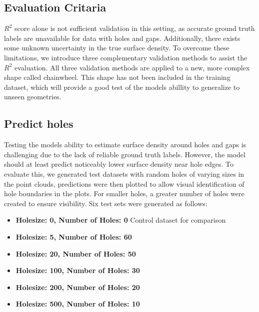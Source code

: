 \subsection{Evaluation Critaria}
$R^2$ score alone is not sufficient validation in this setting, as accurate ground truth labels are unavailable for data with holes and gaps. Additionally, there exists some unknown uncertainty in the true surface density. To overcome these limitations, we introduce three complementary validation methods to assist the $R^2$ evaluation. All three validation methods are applied to a new, more complex shape called chainwheel. This shape has not been included in the training dataset, which will provide a good test of the models abillity to generalize to unseen geometries.

\subsection*{Predict holes}
Testing the models ability to estimate surface density around holes and gaps is challenging due to the lack of reliable ground truth labels. However, the model should at least predict noticeably lower surface density near hole edges. To evaluate this, we generated test datasets with random holes of varying sizes in the point clouds, predictions were then plotted to allow visual identification of hole boundaries in the plots. For smaller holes, a greater number of holes were created to ensure visibility. Six test sets were generated as follows:
\begin{itemize}
    \item \textbf{Holesize: 0, Number of Holes: 0} Control dataset for comparison
    \item \textbf{Holesize: 5, Number of Holes: 60}
    \item \textbf{Holesize: 20, Number of Holes: 50}
    \item \textbf{Holesize: 100, Number of Holes: 30}
    \item \textbf{Holesize: 200, Number of Holes: 20}
    \item \textbf{Holesize: 500, Number of Holes: 10}
\end{itemize}

